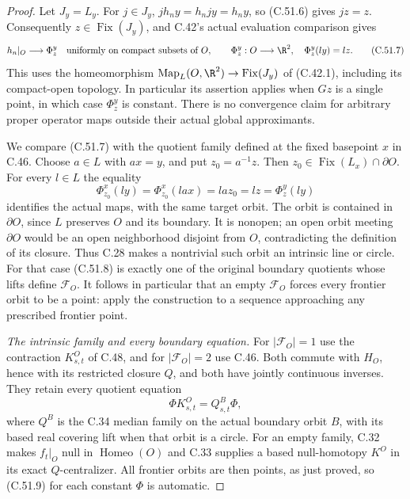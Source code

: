 \begin{proof}
Let $J_y=L_y$. For $j\in J_y$,
$j h_ny=h_nj y=h_ny$, so (C.51.6) gives $jz=z$.
Consequently $z\in\operatorname{Fix}(J_y)$, and
C.42's actual evaluation comparison gives
\[
 h_n|_O\longrightarrow\Phi_z^y
       \quad\hbox{uniformly on compact subsets of }O,
 \qquad
 \Phi_z^y:O\longrightarrow\R^2,\quad \Phi_z^y(ly)=lz.
                                                        \tag{C.51.7}
\]
This uses the homeomorphism
$\operatorname{Map}_L(O,\R^2)\to\operatorname{Fix}(J_y)$
of (C.42.1), including its compact-open topology.
In particular its assertion applies when $Gz$ is
a single point, in which case $\Phi_z^y$ is constant.
There is no convergence claim for arbitrary proper
operator maps outside their actual global approximants.

We compare (C.51.7) with the quotient family defined
at the fixed basepoint $x$ in C.46. Choose $a\in L$
with $ax=y$, and put $z_0=a^{-1}z$.
Then $z_0\in\operatorname{Fix}(L_x)\cap\partial O$.
For every $l\in L$ the equality
\[
             \Phi_{z_0}^x(ly)
                =\Phi_{z_0}^x(lax)
                =la z_0=lz=\Phi_z^y(ly)                \tag{C.51.8}
\]
identifies the actual maps, with the same target orbit.
The orbit is contained in $\partial O$, since $L$
preserves $O$ and its boundary. It is nonopen; an
open orbit meeting $\partial O$ would be an open
neighborhood disjoint from $O$, contradicting the
definition of its closure. Thus C.28 makes a
nontrivial such orbit an intrinsic line or circle.
For that case (C.51.8) is exactly one of the original
boundary quotients whose lifts define $\mathscr F_O$.
It follows in particular that an empty $\mathscr F_O$
forces every frontier orbit to be a point: apply
the construction to a sequence approaching any
prescribed frontier point.

\emph{The intrinsic family and every boundary equation.}
For $|\mathscr F_O|=1$ use the contraction $K^O_{s,t}$
of C.48, and for $|\mathscr F_O|=2$ use C.46.
Both commute with $H_O$, hence with its restricted
closure $Q$, and both have jointly continuous inverses.
They retain every quotient equation
\[
                    \Phi K^O_{s,t}=Q^B_{s,t}\Phi,
                                                        \tag{C.51.9}
\]
where $Q^B$ is the C.34 median family on the actual
boundary orbit $B$, with its based real covering
lift when that orbit is a circle.
For an empty family, C.32 makes $f_t|_O$ null in
$\operatorname{Homeo}(O)$ and C.33 supplies a based
null-homotopy $K^O$ in its exact $Q$-centralizer.
All frontier orbits are then points, as just proved,
so (C.51.9) for each constant $\Phi$ is automatic.


\end{proof}
